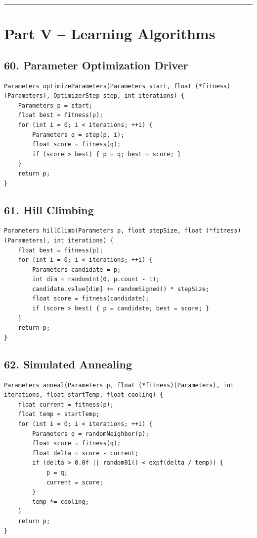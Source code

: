 \documentclass[10pt,letterpaper]{article}
\begin{document}
\medskip\hrule\medskip

\clearpage
\section*{Part V -- Learning Algorithms}

\subsection*{60. Parameter Optimization Driver}
{}

\begin{verbatim}
Parameters optimizeParameters(Parameters start, float (*fitness)(Parameters), OptimizerStep step, int iterations) {
    Parameters p = start;
    float best = fitness(p);
    for (int i = 0; i < iterations; ++i) {
        Parameters q = step(p, i);
        float score = fitness(q);
        if (score > best) { p = q; best = score; }
    }
    return p;
}
\end{verbatim}

\subsection*{61. Hill Climbing}
{}

\begin{verbatim}
Parameters hillClimb(Parameters p, float stepSize, float (*fitness)(Parameters), int iterations) {
    float best = fitness(p);
    for (int i = 0; i < iterations; ++i) {
        Parameters candidate = p;
        int dim = randomInt(0, p.count - 1);
        candidate.value[dim] += randomSigned() * stepSize;
        float score = fitness(candidate);
        if (score > best) { p = candidate; best = score; }
    }
    return p;
}
\end{verbatim}

\subsection*{62. Simulated Annealing}
{}

\begin{verbatim}
Parameters anneal(Parameters p, float (*fitness)(Parameters), int iterations, float startTemp, float cooling) {
    float current = fitness(p);
    float temp = startTemp;
    for (int i = 0; i < iterations; ++i) {
        Parameters q = randomNeighbor(p);
        float score = fitness(q);
        float delta = score - current;
        if (delta > 0.0f || random01() < expf(delta / temp)) {
            p = q;
            current = score;
        }
        temp *= cooling;
    }
    return p;
}
\end{verbatim}
\end{document}
